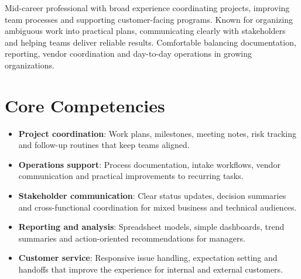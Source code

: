 \documentclass[11pt,a4paper,sans]{moderncv}
\begin{document}
\makecvtitle


\vspace{6pt}
\small{Mid-career professional with broad experience coordinating projects, improving team processes and supporting customer-facing programs. Known for organizing ambiguous work into practical plans, communicating clearly with stakeholders and helping teams deliver reliable results. Comfortable balancing documentation, reporting, vendor coordination and day-to-day operations in growing organizations.}


\section{Core Competencies}
\vspace{1pt}
\begin{itemize}

\item \textbf{Project coordination}: Work plans, milestones, meeting notes, risk tracking and follow-up routines that keep teams aligned.

\item \textbf{Operations support}: Process documentation, intake workflows, vendor communication and practical improvements to recurring tasks.

\item \textbf{Stakeholder communication}: Clear status updates, decision summaries and cross-functional coordination for mixed business and technical audiences.

\item \textbf{Reporting and analysis}: Spreadsheet models, simple dashboards, trend summaries and action-oriented recommendations for managers.

\item \textbf{Customer service}: Responsive issue handling, expectation setting and handoffs that improve the experience for internal and external customers.

\end{itemize}

\end{document}
